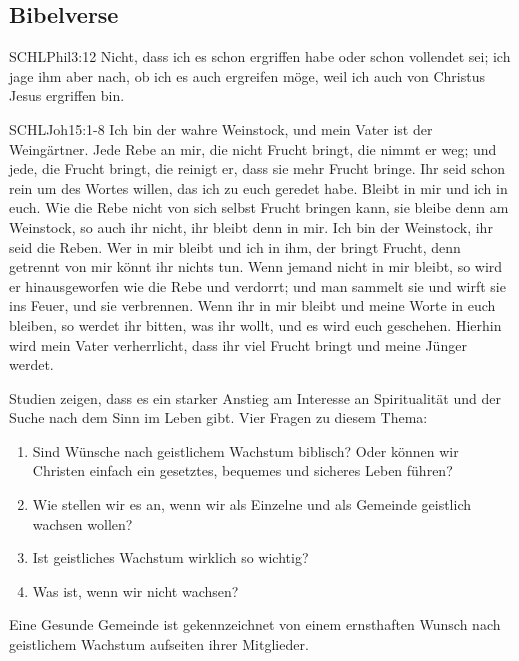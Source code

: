 \documentclass{../../inc/mybib}
\begin{document}
\subsection{Bibelverse}
\begin{bibelbox}{SCHL}{Phil}{3:12}
    Nicht, dass ich es schon ergriffen habe oder schon vollendet sei; ich jage ihm aber nach, ob ich es auch ergreifen möge, weil ich auch von Christus Jesus ergriffen bin.
\end{bibelbox}
\begin{bibelbox}{SCHL}{Joh}{15:1-8}
    Ich bin der wahre Weinstock, und mein Vater ist der Weingärtner. Jede Rebe an mir, die nicht Frucht bringt, die nimmt er weg; und jede, die Frucht bringt, die reinigt er, dass sie mehr Frucht bringe. Ihr seid schon rein um des Wortes willen, das ich zu euch geredet habe. Bleibt in mir und ich in euch. Wie die Rebe nicht von sich selbst Frucht bringen kann, sie bleibe denn am Weinstock, so auch ihr nicht, ihr bleibt denn in mir. Ich bin der Weinstock, ihr seid die Reben. Wer in mir bleibt und ich in ihm, der bringt Frucht, denn getrennt von mir könnt ihr nichts tun. Wenn jemand nicht in mir bleibt, so  wird er hinausgeworfen wie die Rebe und verdorrt; und man sammelt sie und wirft sie ins Feuer, und sie verbrennen. Wenn ihr in mir bleibt und meine Worte in euch bleiben, so werdet ihr bitten, was ihr wollt, und es wird euch geschehen. Hierhin wird mein Vater verherrlicht, dass ihr viel Frucht bringt und meine Jünger werdet.
\end{bibelbox}
Studien zeigen, dass es ein starker Anstieg am Interesse an Spiritualität und der Suche nach dem Sinn im Leben gibt. Vier Fragen zu diesem Thema:
\begin{enumerate}
    \item Sind Wünsche nach geistlichem Wachstum biblisch? Oder können wir Christen einfach ein gesetztes, bequemes und sicheres Leben führen?
    \item Wie stellen wir es an, wenn wir als Einzelne und als Gemeinde geistlich wachsen wollen?
    \item Ist geistliches Wachstum wirklich so wichtig?
    \item Was ist, wenn wir nicht wachsen?
\end{enumerate}
Eine Gesunde Gemeinde ist gekennzeichnet von einem ernsthaften Wunsch nach geistlichem Wachstum aufseiten ihrer Mitglieder.
\end{document}
